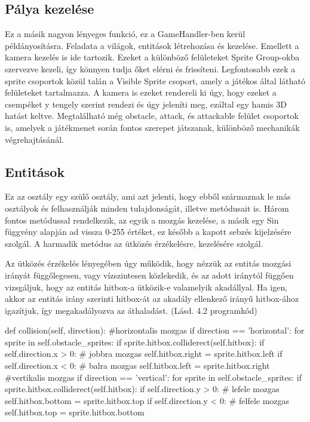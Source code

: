 \subsection{Pálya kezelése}
\indent \indent Ez a másik nagyon lényeges funkció, ez a GameHandler-ben kerül példányosításra. Feladata a világok, entitások létrehozása és kezelése. Emellett a kamera kezelés is ide tartozik. 
Ezeket a különböző felületeket Sprite Group-okba szervezve kezeli, így könnyen tudja őket elérni és frissíteni.
Legfontosabb ezek a sprite csoportok közül talán a Visible Sprite csoport, amely a játékos által látható felületeket tartalmazza. A kamera is ezeket rendereli ki úgy, hogy ezeket a csempéket y tengely szerint rendezi és úgy jeleníti meg, ezáltal egy hamis 3D hatást keltve.
Megtalálható még obstacle, attack, és attackable felület csoportok is, amelyek a játékmenet során fontos szerepet játszanak, különböző mechanikák végrehajtásánál.


\subsection{Entitások}
\indent \indent Ez az osztály egy szülő osztály, ami azt jelenti, hogy ebből származnak le más osztályok és felhasználják minden tulajdonságát, illetve metódusait is.  
Három fontos metódussal rendelkezik, az egyik a mozgás kezelése, a másik egy Sin függvény alapján ad vissza 0-255 értéket, ez később a kapott sebzés kijelzésére szolgál. A harmadik metódus az ütközés érzékelésre, kezelésére szolgál.

Az ütközés érzékelés lényegében úgy működik, hogy nézzük az entitás mozgási irányát függőlegesen, vagy vízszintesen közlekedik, és az adott iránytól függően vizsgáljuk, hogy az entitás hitbox-a ütközik-e valamelyik akadállyal. Ha igen, akkor az entitás irány szerinti hitbox-át az akadály ellenkező irányű hitbox-ához igazítjuk, így megakadályozva az áthaladást. (Lásd. 4.2 programkód)
\begin{python}[caption={Ütközés kezelés},label=py:Ütközés kezelés]
def collision(self, direction):
    #horizontalis mozgas
    if direction == 'horizontal':
        for sprite in self.obstacle_sprites:
            if sprite.hitbox.colliderect(self.hitbox):
                if self.direction.x > 0:
                # jobbra mozgas
                    self.hitbox.right = sprite.hitbox.left
                if self.direction.x < 0:
                # balra mozgas
                    self.hitbox.left = sprite.hitbox.right                   
    #vertikalis mozgas
    if direction == 'vertical':
        for sprite in self.obstacle_sprites:
            if sprite.hitbox.colliderect(self.hitbox):
                    if self.direction.y > 0:
                        # lefele mozgas
                        self.hitbox.bottom = sprite.hitbox.top
                        if self.direction.y < 0:
                        # felfele mozgas
                        self.hitbox.top = sprite.hitbox.bottom
                    \end{python} \cite{collision-handler}

